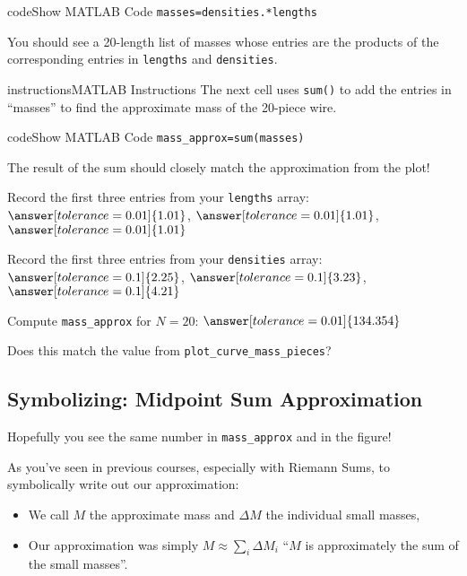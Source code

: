 \documentclass{ximera}
\begin{document}
\begin{expandable}{code}{Show MATLAB Code}
\texttt{masses=densities.*lengths}
\end{expandable}

You should see a 20-length list of masses whose entries are the products of the corresponding entries in \texttt{lengths} and \texttt{densities}.

\begin{expandable}{instructions}{MATLAB Instructions}
The next cell uses \texttt{sum()} to add the entries in ``masses'' to find the approximate mass of the 20-piece wire.
\end{expandable}

\begin{expandable}{code}{Show MATLAB Code}
\texttt{mass\_approx=sum(masses)}
\end{expandable}

The result of the sum should closely match the approximation from the plot!


\begin{problem}
Record the first three entries from your \texttt{lengths} array: $\answer[tolerance=0.01]{1.01}$, $\answer[tolerance=0.01]{1.01}$, $\answer[tolerance=0.01]{1.01}$

Record the first three entries from your \texttt{densities} array: $\answer[tolerance=0.1]{2.25}$, $\answer[tolerance=0.1]{3.23}$, $\answer[tolerance=0.1]{4.21}$

Compute \texttt{mass\_approx} for $N=20$: $\answer[tolerance=0.01]{134.354}$

Does this match the value from \texttt{plot\_curve\_mass\_pieces}? 
\end{problem}

\subsection*{Symbolizing: Midpoint Sum Approximation}

Hopefully you see the same number in \texttt{mass\_approx} and in the figure!

As you've seen in previous courses, especially with Riemann Sums, to symbolically write out our approximation:
\begin{itemize}
\item We call $M$ the approximate mass and $\Delta M$ the individual small masses,
\item Our approximation was simply $M \approx \sum_i \Delta M_i$ ``$M$ is approximately the sum of the small masses''.
\end{itemize}
\end{document}
